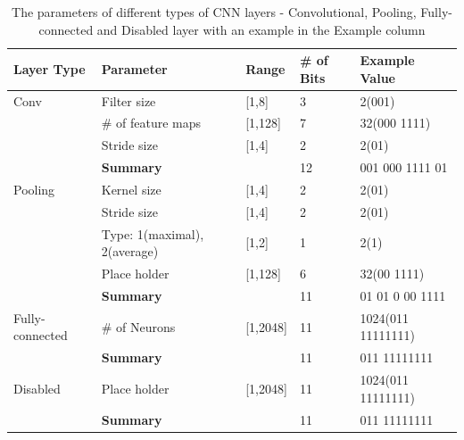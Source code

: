\documentclass[conference]{IEEEtran}
\begin{document}
\begin{table}[!t]
	\renewcommand{\arraystretch}{1.3}
	\caption{The parameters of different types of CNN layers - Convolutional, Pooling, Fully-connected and Disabled layer with an example in the Example column}
	\label{table:CNNFields}
	\centering
	\begin{tabular}{|p{1.5cm}|p{1.5cm}|p{1cm}|p{0.5cm}|p{2cm}|}
		\hline
		Layer Type & Parameter & Range & \# of Bits & Example Value\\
		\hline
		Conv & Filter size & [1,8] & 3 & 2(001)\\
		\hline
		 & \# of feature maps & [1,128] & 7 & 32(000 1111)\\
		\hline
		 & Stride size & [1,4] & 2 & 2(01)\\
		\hline
		 & \textbf{Summary} &  & 12 & 001 000 1111 01\\
		\hline
		Pooling & Kernel size & [1,4] & 2 & 2(01)\\
		\hline
		 & Stride size & [1,4] & 2 & 2(01)\\
		\hline
		 & Type: 1(maximal), 2(average) & [1,2] & 1 & 2(1)\\
		\hline
		 & Place holder & [1,128] & 6 & 32(00 1111)\\
		\hline
		 & \textbf{Summary} &  & 11 & 01 01 0 00 1111\\
		\hline
		Fully-connected & \# of Neurons & [1,2048] & 11 & 1024(011 11111111)\\
		\hline
		 & \textbf{Summary} &  & 11 & 011 11111111\\
		\hline
		Disabled & Place holder & [1,2048] & 11 & 1024(011 11111111)\\
		\hline
		 & \textbf{Summary} &  & 11 & 011 11111111\\
		\hline
	\end{tabular}
\end{table}
\end{document}
